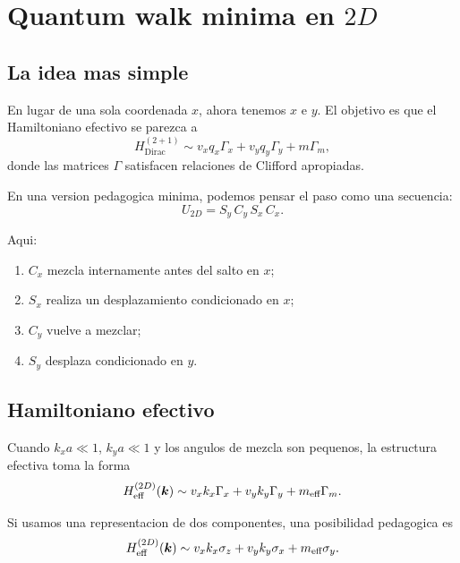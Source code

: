 \section{Quantum walk minima en \(2D\)}

\subsection{La idea mas simple}

En lugar de una sola coordenada \(x\), ahora tenemos \(x\) e \(y\). El objetivo es que el Hamiltoniano efectivo se parezca a
\begin{equation}
H_{\text{Dirac}}^{(2+1)}\sim v_x q_x \Gamma_x + v_y q_y \Gamma_y + m\Gamma_m,
\label{c04:eq:dirac21}
\end{equation}
donde las matrices \(\Gamma\) satisfacen relaciones de Clifford apropiadas.

En una version pedagogica minima, podemos pensar el paso como una secuencia:
\begin{equation}
U_{2D}=S_y\,C_y\,S_x\,C_x.
\label{c04:eq:u2d}
\end{equation}

Aqui:

\begin{enumerate}[leftmargin=*]
  \item \(C_x\) mezcla internamente antes del salto en \(x\);
  \item \(S_x\) realiza un desplazamiento condicionado en \(x\);
  \item \(C_y\) vuelve a mezclar;
  \item \(S_y\) desplaza condicionado en \(y\).
\end{enumerate}

\subsection{Hamiltoniano efectivo}

Cuando \(k_x a\ll 1\), \(k_y a\ll 1\) y los angulos de mezcla son pequenos, la estructura efectiva toma la forma
\begin{equation}
H_{\text{eff}}^{(2D)}(\bm{k})\sim v_x k_x \Gamma_x + v_y k_y \Gamma_y + m_{\text{eff}}\Gamma_m.
\label{c04:eq:heff-2d}
\end{equation}

Si usamos una representacion de dos componentes, una posibilidad pedagogica es
\begin{equation}
H_{\text{eff}}^{(2D)}(\bm{k})\sim v_x k_x \sigma_z + v_y k_y \sigma_x + m_{\text{eff}}\sigma_y.
\label{c04:eq:dirac-2d-walk}
\end{equation}


